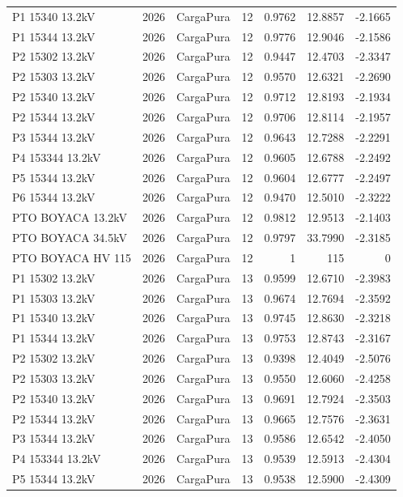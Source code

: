 \documentclass[11pt,a4paper]{article}
\begin{document}
\begin{longtable}{llllrrr}
P1 15340 13.2kV & 2026 & CargaPura & 12 & 0.9762 & 12.8857 & -2.1665 \\
P1 15344 13.2kV & 2026 & CargaPura & 12 & 0.9776 & 12.9046 & -2.1586 \\
P2 15302 13.2kV & 2026 & CargaPura & 12 & 0.9447 & 12.4703 & -2.3347 \\
P2 15303 13.2kV & 2026 & CargaPura & 12 & 0.9570 & 12.6321 & -2.2690 \\
P2 15340 13.2kV & 2026 & CargaPura & 12 & 0.9712 & 12.8193 & -2.1934 \\
P2 15344 13.2kV & 2026 & CargaPura & 12 & 0.9706 & 12.8114 & -2.1957 \\
P3 15344 13.2kV & 2026 & CargaPura & 12 & 0.9643 & 12.7288 & -2.2291 \\
P4 153344 13.2kV & 2026 & CargaPura & 12 & 0.9605 & 12.6788 & -2.2492 \\
P5 15344 13.2kV & 2026 & CargaPura & 12 & 0.9604 & 12.6777 & -2.2497 \\
P6 15344 13.2kV & 2026 & CargaPura & 12 & 0.9470 & 12.5010 & -2.3222 \\
PTO BOYACA 13.2kV & 2026 & CargaPura & 12 & 0.9812 & 12.9513 & -2.1403 \\
PTO BOYACA 34.5kV & 2026 & CargaPura & 12 & 0.9797 & 33.7990 & -2.3185 \\
PTO BOYACA HV 115 & 2026 & CargaPura & 12 & 1 & 115 & 0 \\
P1 15302 13.2kV & 2026 & CargaPura & 13 & 0.9599 & 12.6710 & -2.3983 \\
P1 15303 13.2kV & 2026 & CargaPura & 13 & 0.9674 & 12.7694 & -2.3592 \\
P1 15340 13.2kV & 2026 & CargaPura & 13 & 0.9745 & 12.8630 & -2.3218 \\
P1 15344 13.2kV & 2026 & CargaPura & 13 & 0.9753 & 12.8743 & -2.3167 \\
P2 15302 13.2kV & 2026 & CargaPura & 13 & 0.9398 & 12.4049 & -2.5076 \\
P2 15303 13.2kV & 2026 & CargaPura & 13 & 0.9550 & 12.6060 & -2.4258 \\
P2 15340 13.2kV & 2026 & CargaPura & 13 & 0.9691 & 12.7924 & -2.3503 \\
P2 15344 13.2kV & 2026 & CargaPura & 13 & 0.9665 & 12.7576 & -2.3631 \\
P3 15344 13.2kV & 2026 & CargaPura & 13 & 0.9586 & 12.6542 & -2.4050 \\
P4 153344 13.2kV & 2026 & CargaPura & 13 & 0.9539 & 12.5913 & -2.4304 \\
P5 15344 13.2kV & 2026 & CargaPura & 13 & 0.9538 & 12.5900 & -2.4309 \\

\end{longtable}
\end{document}
